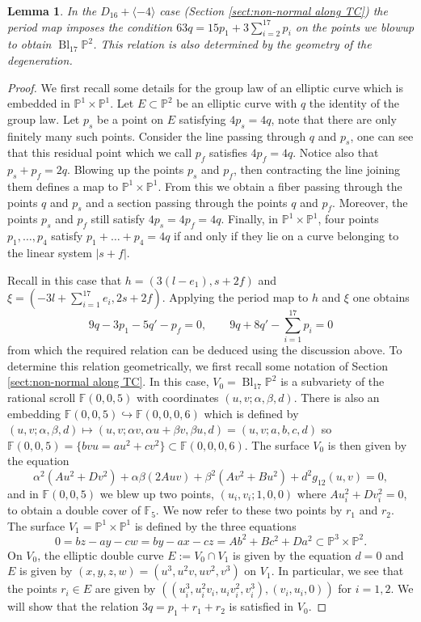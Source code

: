 \documentclass[a4paper]{amsart}
\theoremstyle{definition}
\theoremstyle{plain}
\newtheorem{lemma}[defn]{Lemma}
\theoremstyle{remark}
\newcommand{\PS}{\mathbb{P}}
\newcommand{\F}{\mathbb{F}}
\begin{document}
\begin{lemma}
In the $D_{16}+\langle -4 \rangle$ case (Section \ref{sect:non-normal along TC}) the period map imposes the condition $63q=15p_1+3\sum_{i=2}^{17}p_i$ on the points we blowup to obtain $\operatorname{Bl}_{17}\PS^2$. This relation is also determined by the geometry of the degeneration.
\end{lemma}

\begin{proof}
We first recall some details for the group law of an elliptic curve which is embedded in $\PS^1\times\PS^1$. Let $E\subset\PS^2$ be an elliptic curve with $q$ the identity of the group law. Let $p_s$ be a point on $E$ satisfying $4p_s=4q$, note that there are only finitely many such points. Consider the line passing through $q$ and $p_s$, one can see that this residual point which we call $p_f$ satisfies $4p_f=4q$. Notice also that $p_s+p_f=2q$. Blowing up the points $p_s$ and $p_f$, then contracting the line joining them defines a map to $\PS^1\times\PS^1$. From this we obtain a fiber passing through the points $q$ and $p_s$ and a section passing through the points $q$ and $p_f$. Moreover, the points $p_s$ and $p_f$ still satisfy $4p_s=4p_f=4q$. Finally, in $\PS^1\times\PS^1$, four points $p_1,\dots,p_4$ satisfy $p_1+\dots+p_4=4q$ if and only if they lie on a curve belonging to the linear system $|s+f|$.


Recall in this case that $h=(3(l-e_1),s+2f)$ and $\xi=(-3l+\sum_{i=1}^{17}e_i,2s+2f)$. Applying the period map to $h$ and $\xi$ one obtains
$$9q-3p_1-5q'-p_f=0, \qquad 9q+8q'-\sum_{i=1}^{17}p_i=0$$
from which the required relation can be deduced using the discussion above. To determine this relation geometrically, we first recall some notation of Section \ref{sect:non-normal along TC}. In this case, $V_0=\operatorname{Bl}_{17}\PS^2$ is a subvariety of the rational scroll $\F(0,0,5)$ with coordinates $(u,v;\alpha,\beta,d)$. There is also an embedding $\F(0,0,5)\hookrightarrow\F(0,0,0,6)$ which is defined by $(u,v;\alpha,\beta,d)\mapsto (u,v;\alpha v,\alpha u +\beta v,\beta u,d)=(u,v;a,b,c,d)$ so $\F(0,0,5)=\{bvu=au^2+cv^2\}\subset \F(0,0,0,6)$. The surface $V_0$ is then given by the equation 
$$\alpha^2(Au^2+Dv^2)+\alpha\beta(2Auv)+\beta^2(Av^2+Bu^2)+d^2g_{12}(u,v) =0,$$
and in $\F(0,0,5)$ we blew up two points, $(u_i,v_i;1,0,0)$ where $Au_i^2+Dv_i^2=0$, to obtain a double cover of $\F_5$. We now refer to these two points by $r_1$ and $r_2$. The surface $V_1=\PS^1\times \PS^1$ is defined by the three equations 
$$0=bz-ay-cw=by-ax-cz = Ab^2+Bc^2+Da^2 \subset \mathbb{P}^3\times \mathbb{P}^2.$$
On $V_0$, the elliptic double curve $E:=V_0\cap V_1$ is given by the equation $d=0$ and $E$ is given by $(x,y,z,w)=(u^3,u^2v,uv^2,v^3)$ on $V_1$. In particular, we see that the points $r_i\in E$ are given by $\left((u_i^3,u_i^2v_i,u_iv_i^2,v_i^3),(v_i,u_i,0)\right)$ for $i=1,2$. We will show that the relation $3q=p_1+r_1+r_2$ is satisfied in $V_0$.


\end{proof}
\end{document}
